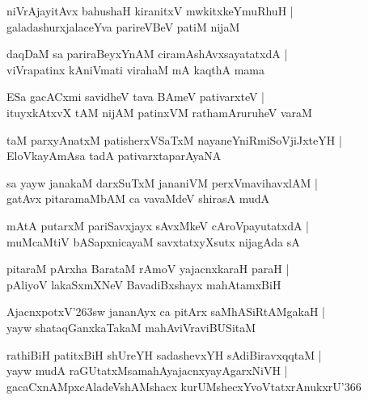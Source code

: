 \documentclass[twoside,12pt,openright]{book}
\def\S{\char'263}
\newcounter{shloka}[chapter]
\begin{document}
\begin{shloka}%
niVrAjayitAvx bahushaH kiranitxV mwkitxkeYmuRhuH |\\
galadashurxjalaceYva parireVBeV patiM nijaM 
\end{shloka}

\begin{shloka}%
daqDaM sa pariraBeyxYnAM ciramAshAvxsayatatxdA |\\
viVrapatinx kAniVmati virahaM mA kaqthA mama
\end{shloka}

\begin{shloka}%
ESa gacACxmi savidheV tava BAmeV pativarxteV |\\
ituyxkAtxvX tAM nijAM patinxVM rathamAruruheV varaM 
\end{shloka}

\begin{shloka}%
taM parxyAnatxM patisherxVSaTxM nayaneYniRmiSoVjiJxteYH |\\
EloVkayAmAsa tadA pativarxtaparAyaNA
\end{shloka}

\begin{shloka}%
sa yayw janakaM darxSuTxM jananiVM perxVmavihavxlAM |\\
gatAvx pitaramaMbAM ca vavaMdeV shirasA mudA 
\end{shloka}

\begin{shloka}%
mAtA putarxM pariSavxjayx sAvxMkeV cAroVpayutatxdA |\\
muMcaMtiV bASapxnicayaM savxtatxyXsutx nijagAda sA 
\end{shloka}

\begin{shloka}%
pitaraM pArxha BarataM rAmoV yajacnxkaraH paraH |\\
pAliyoV lakaSxmXNeV BavadiBxshayx mahAtamxBiH 
\end{shloka}

\begin{shloka}%
AjacnxpotxV\S sw jananAyx ca pitArx saMhASiRtAMgakaH |\\
yayw shataqGanxkaTakaM mahAviVraviBUSitaM 
\end{shloka}

\begin{shloka}%
rathiBiH patitxBiH shUreYH sadashevxYH sAdiBiravxqqtaM |\\
yayw mudA raGUtatxMsamahAyajacnxyayAgarxNiVH |\\
gacaCxnAMpxcAladeVshAMshacx kurUMshecxYvoVtatxrAnukxrU\char'366
\end{shloka}
\end{document}
